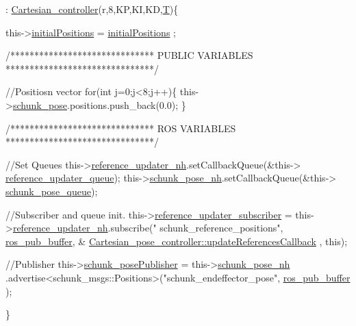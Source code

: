 \begin{DoxyCode}
                                                                               
                                                                        : 
      \hyperlink{classCartesian__controller_a71055bb1cbf01ced9e64bb1d184b68fe}{Cartesian\_controller}(r,8,KP,KI,KD,\hyperlink{classCartesian__controller_a35c6ddbb9624878f2807ff644a33e832}{T})\{


        this->\hyperlink{classCartesian__pose__controller_a42433d7f2e4e03ccaac56e1f9a7a5027}{initialPositions} = \hyperlink{classCartesian__pose__controller_a42433d7f2e4e03ccaac56e1f9a7a5027}{initialPositions}
      ;

        \textcolor{comment}{/******************************}
\textcolor{comment}{                 PUBLIC VARIABLES}
\textcolor{comment}{        *******************************/}

        \textcolor{comment}{//Positiosn vector}
        \textcolor{keywordflow}{for}(\textcolor{keywordtype}{int} j=0;j<8;j++)\{
                this->\hyperlink{classCartesian__pose__controller_a301bc44e901e4837cf036661478354c4}{schunk\_pose}.positions.push\_back(0.0);
        \}

        \textcolor{comment}{/******************************}
\textcolor{comment}{                  ROS VARIABLES}
\textcolor{comment}{        *******************************/}

        \textcolor{comment}{//Set Queues}
        this->\hyperlink{classCartesian__pose__controller_ab2d5fe68c8229b6c90f84ac1601eb637}{reference\_updater\_nh}.setCallbackQueue(&this->
      \hyperlink{classCartesian__pose__controller_a6eea82d82ccd6c925be31c18e1b4a432}{reference\_updater\_queue});
        this->\hyperlink{classCartesian__pose__controller_a41a692189fed59ec8ec8460539f63c66}{schunk\_pose\_nh}.setCallbackQueue(&this->
      \hyperlink{classCartesian__pose__controller_a5efe52a57e5239b3fd86ff456e94691b}{schunk\_pose\_queue});

        \textcolor{comment}{//Subscriber and queue init.}
        this->\hyperlink{classCartesian__pose__controller_a9394ae99649279f815c234b1ca7801b6}{reference\_updater\_subscriber}         
      = this->\hyperlink{classCartesian__pose__controller_ab2d5fe68c8229b6c90f84ac1601eb637}{reference\_updater\_nh}.subscribe(\textcolor{stringliteral}{"
      schunk\_reference\_positions"}, \hyperlink{classCartesian__controller_ab9ed5a808da204dbc612d313dc7332f4}{ros\_pub\_buffer}, &
      \hyperlink{classCartesian__pose__controller_af9c1ec1f565375f50f8a15b16464f94d}{Cartesian\_pose\_controller::updateReferencesCallback}
      , \textcolor{keyword}{this});

        \textcolor{comment}{//Publisher}
        this->\hyperlink{classCartesian__pose__controller_a9eb38e771e5006950b9a8075a0ea7e49}{schunk\_posePublisher}   = this->\hyperlink{classCartesian__pose__controller_a41a692189fed59ec8ec8460539f63c66}{schunk\_pose\_nh}
      .advertise<schunk\_msgs::Positions>(\textcolor{stringliteral}{"schunk\_endeffector\_pose"}, \hyperlink{classCartesian__controller_ab9ed5a808da204dbc612d313dc7332f4}{ros\_pub\_buffer}
      );

\}
\end{DoxyCode}


